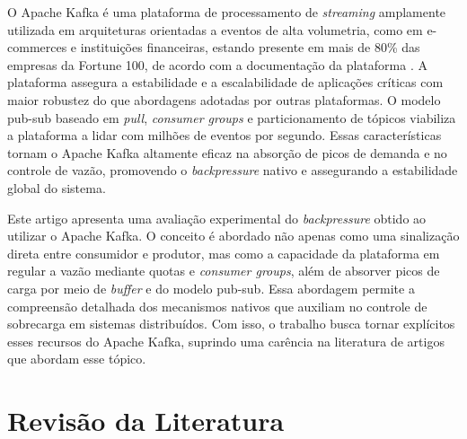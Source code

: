 \documentclass[12pt]{article}
\begin{document}
  O Apache Kafka é uma plataforma de processamento de \textit{streaming} amplamente utilizada em arquiteturas orientadas a eventos de alta volumetria, como em e-commerces e instituições financeiras, estando presente em mais de 80\% das empresas da Fortune 100, de acordo com a documentação da plataforma \cite{apacheKafka2026Poweredby}. A plataforma assegura a estabilidade e a escalabilidade de aplicações críticas \cite{meissner2018} com maior robustez do que abordagens adotadas por outras plataformas. O modelo pub-sub baseado em \textit{pull}, \textit{consumer groups} e particionamento de tópicos viabiliza a plataforma a lidar com milhões de eventos por segundo.  Essas características tornam o Apache Kafka altamente eficaz na absorção de picos de demanda e no controle de vazão, promovendo o \textit{backpressure} nativo e assegurando a estabilidade global do sistema.

  Este artigo apresenta uma avaliação experimental do \textit{backpressure} obtido ao utilizar o Apache Kafka. O conceito é abordado não apenas como uma sinalização direta entre consumidor e produtor, mas como a capacidade da plataforma em regular a vazão mediante quotas e \textit{consumer groups}, além de absorver picos de carga por meio de \textit{buffer} e do modelo pub-sub. Essa abordagem permite a compreensão detalhada dos mecanismos nativos que auxiliam no controle de sobrecarga em sistemas distribuídos. Com isso, o trabalho busca tornar explícitos esses recursos do Apache Kafka, suprindo uma carência na literatura de artigos que abordam esse tópico.

  \section{Revisão da Literatura} \label{sec:firstpage}
\end{document}
